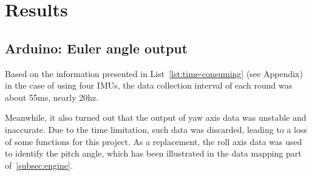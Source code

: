 \chapter{Results}


\section{Arduino: Euler angle output}
Based on the information presented in List~\ref{lst:time-consuming} (see Appendix) in the case of using four IMUs, the data collection interval of each round was about 55ms, nearly 20hz.

Meanwhile, it also turned out that the output of yaw axis data was unstable and inaccurate.
Due to the time limitation, such data was discarded, leading to a loss of some functions for this project.
As a replacement, the roll axis data was used to identify the pitch angle, which has been illustrated in the data mapping part of~\ref{subsec:engine}.

